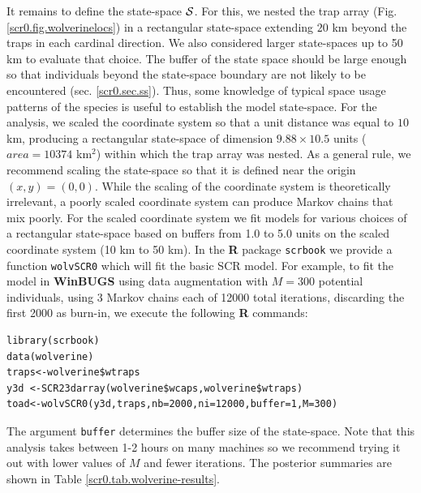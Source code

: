 It remains to define the
state-space ${\cal S}$. For this, we nested the trap array (Fig.
\ref{scr0.fig.wolverinelocs}) in a
 rectangular state-space extending $20$ km beyond the traps in each cardinal
direction.  We also considered larger state-spaces up to 50 km to
evaluate that choice.  The buffer of the state space should be large
enough so that individuals beyond the state-space boundary are not
likely to be encountered
(sec. \ref{scr0.sec.ss}).
Thus, some knowledge of typical space usage
patterns of the species is useful to establish the model state-space.  For the analysis,
we scaled the coordinate system
so that a unit distance was equal to $10$ km, producing a rectangular
state-space of dimension $9.88 \times 10.5$ units ($area = 10374$ km$^2$)
within which the trap array was nested. As a general rule, we
recommend scaling the state-space so that it is defined near the
origin $(x,y)=(0,0)$. While the scaling of the coordinate system is
theoretically irrelevant, a poorly scaled coordinate system can
produce Markov chains that mix poorly.  For the scaled coordinate
system we fit models for various choices of a rectangular state-space
based on
buffers from 1.0 to 5.0 units on the scaled coordinate system (10 km to
50 km). In the {\bf R} package \mbox{\tt scrbook} we provide a
function
\mbox{\tt wolvSCR0} which will fit the basic SCR model. For
example, to fit the model in
{\bf WinBUGS} using data augmentation with $M=300$ potential individuals,
using 3 Markov chains each of 12000 total iterations, discarding the
first 2000 as burn-in, we execute the following {\bf R} commands:
{\small
\begin{verbatim}
library(scrbook)
data(wolverine)
traps<-wolverine$wtraps
y3d <-SCR23darray(wolverine$wcaps,wolverine$wtraps)
toad<-wolvSCR0(y3d,traps,nb=2000,ni=12000,buffer=1,M=300)
\end{verbatim}
}
The argument \mbox{\tt buffer} determines the buffer size of the
state-space.  Note that this analysis takes between 1-2 hours on many
machines so we recommend trying it out with lower values of $M$ and
fewer iterations.  The posterior summaries are shown in
Table \ref{scr0.tab.wolverine-results}.

